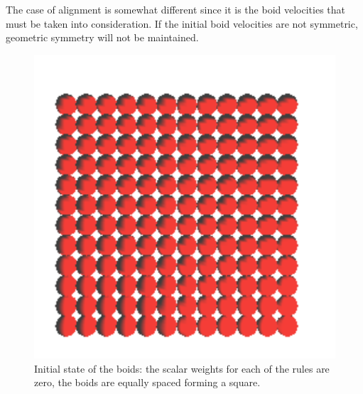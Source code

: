 The case of alignment is somewhat different since it is the boid velocities that must be taken into consideration. If the initial boid velocities are not symmetric, geometric symmetry will not be maintained. 

\begin{figure}[htbp]
\begin{center}
\includegraphics[scale=0.5]{figures/align.pdf}
\caption{Initial state of the boids: the scalar weights for each of the rules are zero, the boids are equally spaced forming a square.}
\label{alignRule}
\end{center}
\end{figure}

